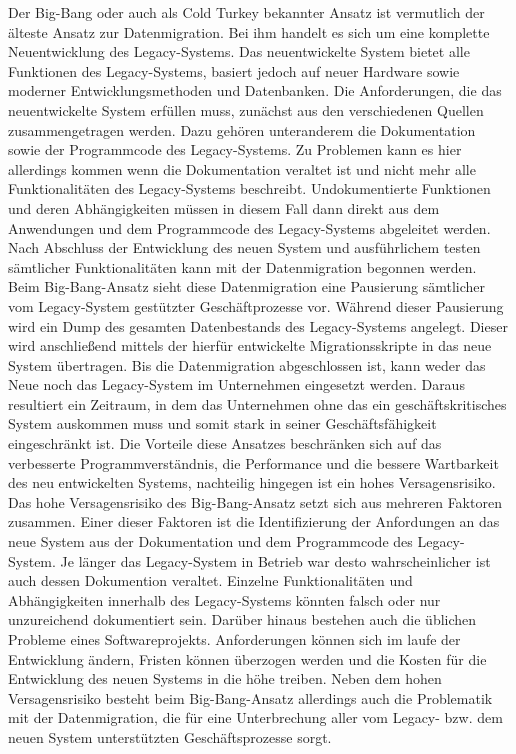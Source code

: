 Der Big-Bang oder auch als Cold Turkey bekannter Ansatz ist vermutlich der älteste Ansatz zur Datenmigration. Bei ihm handelt es sich um eine komplette Neuentwicklung des Legacy-Systems. Das neuentwickelte System bietet alle Funktionen des Legacy-Systems, basiert jedoch auf neuer Hardware sowie moderner Entwicklungsmethoden und Datenbanken.\citep[S. 105]{bisbal-1999}
\lb
Die Anforderungen, die das neuentwickelte System erfüllen muss, zunächst aus den verschiedenen Quellen zusammengetragen werden. Dazu gehören unteranderem die Dokumentation sowie der Programmcode des Legacy-Systems.\citep[S. 2]{brodie-1993} Zu Problemen kann es hier allerdings kommen wenn die Dokumentation veraltet ist und nicht mehr alle Funktionalitäten des Legacy-Systems beschreibt. Undokumentierte Funktionen und deren Abhängigkeiten müssen in diesem Fall dann direkt aus dem Anwendungen und dem Programmcode des Legacy-Systems abgeleitet werden.\citep[S. 2]{brodie-1993} 
\lb
Nach Abschluss der Entwicklung des neuen System und ausführlichem testen sämtlicher Funktionalitäten kann mit der Datenmigration begonnen werden. Beim Big-Bang-Ansatz sieht diese Datenmigration eine Pausierung sämtlicher vom Legacy-System gestützter Geschäftprozesse vor.\citep[S. 4]{wuLawless-1997} Während dieser Pausierung wird ein Dump des gesamten Datenbestands des Legacy-Systems angelegt. Dieser wird anschließend mittels der hierfür entwickelte Migrationsskripte in das neue System übertragen.\citep[S. 3]{brodie-1993} Bis die Datenmigration abgeschlossen ist, kann weder das Neue noch das Legacy-System im Unternehmen eingesetzt werden. Daraus resultiert ein Zeitraum, in dem das Unternehmen ohne das ein geschäftskritisches System auskommen muss und somit stark in seiner Geschäftsfähigkeit eingeschränkt ist.\citep[S. 3f]{brodie-1993}
\lb
Die Vorteile diese Ansatzes beschränken sich auf das verbesserte Programmverständnis, die Performance und die bessere Wartbarkeit des neu entwickelten Systems, nachteilig hingegen ist ein hohes Versagensrisiko.\citep[S. 105]{bisbal-1999} Das hohe Versagensrisiko des Big-Bang-Ansatz setzt sich aus mehreren Faktoren zusammen. Einer dieser Faktoren ist die Identifizierung der Anfordungen an das neue System aus der Dokumentation und dem Programmcode des Legacy-System. Je länger das Legacy-System in Betrieb war desto wahrscheinlicher ist auch dessen Dokumention veraltet. Einzelne Funktionalitäten und Abhängigkeiten innerhalb des Legacy-Systems könnten falsch oder nur unzureichend dokumentiert sein.\citep[S. 2]{brodie-1993} Darüber hinaus bestehen auch die üblichen Probleme eines Softwareprojekts. Anforderungen können sich im laufe der Entwicklung ändern, Fristen können überzogen werden und die Kosten für die Entwicklung des neuen Systems in die höhe treiben.\citep[S. 2f]{brodie-1993} Neben dem hohen Versagensrisiko besteht beim Big-Bang-Ansatz allerdings auch die Problematik mit der Datenmigration, die für eine Unterbrechung aller vom Legacy- bzw. dem neuen System unterstützten Geschäftsprozesse sorgt.\citep[S. 4]{wuLawless-1997}
